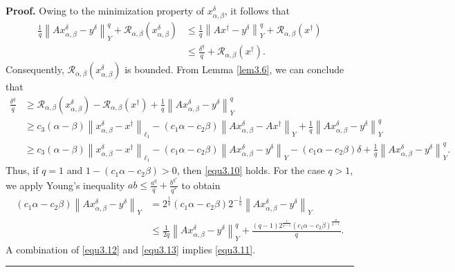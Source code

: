 \documentclass[a4paper,12pt]{article}
\numberwithin{equation}{section}
\newenvironment{proof}[1][Proof]{\textbf{#1.} }
{\ \rule{0.75em}{0.75em}\smallskip}
\begin{document}
\begin{proof}
    Owing to the minimization property of $x_{\alpha,\beta}^{\delta}$, it follows that
    \begin{align*}
        \frac{1}{q}\left\|Ax_{\alpha,\beta}^{\delta}-y^{\delta}\right\|_{Y}^{q}+ \mathcal{R}_{\alpha,\beta}\left(x_{\alpha,\beta}^{\delta}\right) 
        & \leq \frac{1}{q}\left\|Ax^{\dagger}-y^{\delta}\right\|_{Y}^{q}+ \mathcal{R}_{\alpha,\beta}\left(x^{\dagger}\right) \\
        & \leq \frac{\delta^{q}}{q}+\mathcal{R}_{\alpha,\beta}\left(x^{\dagger}\right).
    \end{align*}
    Consequently, $\mathcal{R}_{\alpha,\beta}\left(x_{\alpha,\beta}^{\delta}\right)$ is bounded. From Lemma \ref{lem3.6}, we can conclude that
    \begin{align}\label{equ3.12}
        \frac{\delta^{q}}{q}
        & \geq \mathcal{R}_{\alpha,\beta}\left(x_{\alpha,\beta}^{\delta}\right)- \mathcal{R}_{\alpha,\beta}\left(x^{\dagger}\right)+ \frac{1}{q}\left\|Ax_{\alpha,\beta}^{\delta}-y^{\delta}\right\|_{Y}^{q}  \nonumber\\
        & \geq  c_{3}\left(\alpha-\beta\right)\left\|x_{\alpha,\beta}^{\delta}-x^{\dagger}\right\|_{\ell_{1}}- \left(c_{1}\alpha-c_{2}\beta\right)\left\|Ax_{\alpha,\beta}^{\delta}-Ax^{\dagger}\right\|_{Y}+ \frac{1}{q}\left\|Ax_{\alpha,\beta}^{\delta}-y^{\delta}\right\|_{Y}^{q}  \nonumber\\
        & \geq c_{3}\left(\alpha-\beta\right)\left\|x_{\alpha,\beta}^{\delta}-x^{\dagger}\right\|_{\ell_{1}}- \left(c_{1}\alpha-c_{2}\beta\right)\left\|Ax_{\alpha,\beta}^{\delta}-y^{\delta}\right\|_{Y}- \left(c_{1}\alpha-c_{2}\beta\right)\delta+ \frac{1}{q}\left\|Ax_{\alpha,\beta}^{\delta}-y^{\delta}\right\|_{Y}^{q}.
    \end{align}
    Thus, if $q=1$ and $1-\left(c_{1}\alpha-c_{2}\beta\right) >0$, then \eqref{equ3.10} holds. For the case $q>1$, we apply Young's inequality $ab \leq \frac{a^{q}}{q}+\frac{b^{q^{*}}}{q^{*}}$ to obtain
    \begin{align}\label{equ3.13}
        \left(c_{1}\alpha-c_{2}\beta\right)\left\|Ax_{\alpha,\beta}^{\delta}-y^{\delta}\right\|_{Y}
        & =2^{\frac{1}{q}}\left(c_{1}\alpha-c_{2}\beta\right)2^{-\frac{1}{q}} \left\|Ax_{\alpha,\beta}^{\delta}-y^{\delta}\right\|_{Y} \nonumber\\
        & \leq \frac{1}{2q}\left\|Ax_{\alpha,\beta}^{\delta}-y^{\delta}\right\|_{Y}^{q}+ \frac{\left(q-1\right)2^{\frac{1}{q-1}}\left(c_{1}\alpha-c_{2}\beta\right)^{\frac{q}{q-1}}}{q}.
    \end{align}
    A combination of \eqref{equ3.12} and \eqref{equ3.13} implies \eqref{equ3.11}.
\end{proof}
\end{document}
